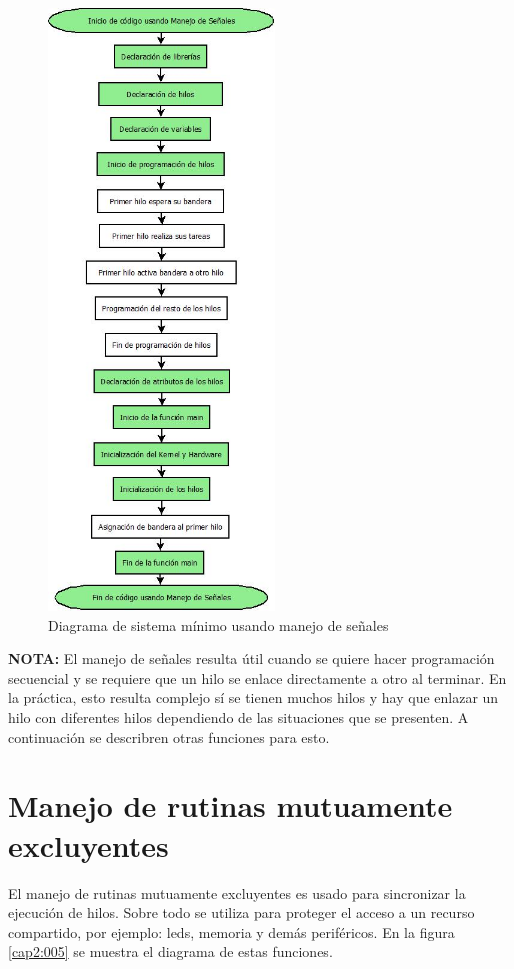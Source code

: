 \documentclass[12pt, twoside]{report}
\begin{document}
\begin{figure}[H]
	\centering
	\includegraphics[width=60mm]{senales}
	\caption{Diagrama de sistema mínimo usando manejo de señales}
	\label{cap2:004}
\end{figure}

\textbf{NOTA:}
El manejo de señales resulta útil cuando se quiere hacer programación secuencial y se requiere que un hilo se enlace directamente a otro al terminar. En la práctica, esto resulta complejo sí se tienen muchos hilos y hay que enlazar un hilo con diferentes hilos dependiendo de las situaciones que se presenten. A continuación se describren otras funciones para esto.

\section{Manejo de rutinas mutuamente excluyentes}

El manejo de rutinas mutuamente excluyentes es usado para sincronizar la ejecución de hilos. Sobre todo se utiliza para proteger el acceso a un recurso compartido, por ejemplo: leds, memoria y demás periféricos.  En la figura \ref{cap2:005} se muestra el diagrama de estas funciones.
\end{document}
